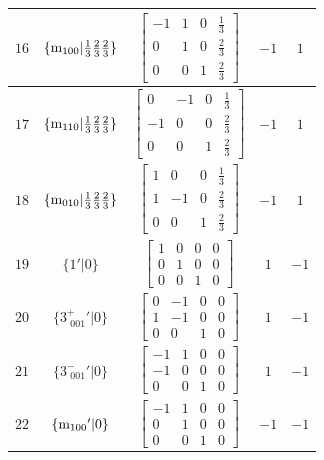 \documentclass[fleqn,8pt]{jsarticle}
\begin{document}
\begin{longtable}{ccccc}
$ 16 $ & $ \{{\rm m}_{100}|\frac{1}{3} \frac{2}{3} \frac{2}{3}\} $ & $ \begin{bmatrix} -1 & 1 & 0 & \frac{1}{3} \\ 0 & 1 & 0 & \frac{2}{3} \\ 0 & 0 & 1 & \frac{2}{3} \end{bmatrix} $ & $ -1 $ & $ 1 $ \\ \hline
$ 17 $ & $ \{{\rm m}_{110}|\frac{1}{3} \frac{2}{3} \frac{2}{3}\} $ & $ \begin{bmatrix} 0 & -1 & 0 & \frac{1}{3} \\ -1 & 0 & 0 & \frac{2}{3} \\ 0 & 0 & 1 & \frac{2}{3} \end{bmatrix} $ & $ -1 $ & $ 1 $ \\ \hline
$ 18 $ & $ \{{\rm m}_{010}|\frac{1}{3} \frac{2}{3} \frac{2}{3}\} $ & $ \begin{bmatrix} 1 & 0 & 0 & \frac{1}{3} \\ 1 & -1 & 0 & \frac{2}{3} \\ 0 & 0 & 1 & \frac{2}{3} \end{bmatrix} $ & $ -1 $ & $ 1 $ \\ \hline
$ 19 $ & $ \{1{}'|0\} $ & $ \begin{bmatrix} 1 & 0 & 0 & 0 \\ 0 & 1 & 0 & 0 \\ 0 & 0 & 1 & 0 \end{bmatrix} $ & $ 1 $ & $ -1 $ \\ \hline
$ 20 $ & $ \{3^{+}_{\,\,001}{}'|0\} $ & $ \begin{bmatrix} 0 & -1 & 0 & 0 \\ 1 & -1 & 0 & 0 \\ 0 & 0 & 1 & 0 \end{bmatrix} $ & $ 1 $ & $ -1 $ \\ \hline
$ 21 $ & $ \{3^{-}_{\,\,001}{}'|0\} $ & $ \begin{bmatrix} -1 & 1 & 0 & 0 \\ -1 & 0 & 0 & 0 \\ 0 & 0 & 1 & 0 \end{bmatrix} $ & $ 1 $ & $ -1 $ \\ \hline
$ 22 $ & $ \{{\rm m}_{100}{}'|0\} $ & $ \begin{bmatrix} -1 & 1 & 0 & 0 \\ 0 & 1 & 0 & 0 \\ 0 & 0 & 1 & 0 \end{bmatrix} $ & $ -1 $ & $ -1 $ \\ \hline

\end{longtable}
\end{document}
